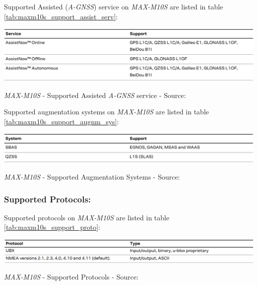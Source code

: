 \documentclass[report.tex]{subfiles}
\begin{document}
Supported Assisted (\textit{A-GNSS}) service on \textit{MAX-M10S} are listed in table \ref{tab:maxm10s_support_assist_serv}:

\begin{table}[H]
	\centering
	\includegraphics[width=1\textwidth]{Include/Figure/comp/maxm10s_support_assist_serv.png}
\caption{\textit{MAX-M10S} - Supported Assisted \textit{A-GNSS} service - Source: \cite{MAXM10S}}
\label{tab:maxm10s_support_assist_serv}
\end{table}

Supported augmentation systems on \textit{MAX-M10S} are listed in table \ref{tab:maxm10s_support_augnm_sys}:

\begin{table}[H]
	\centering
	\includegraphics[width=1\textwidth]{Include/Figure/comp/maxm10s_support_augnm_sys.png}
\caption{\textit{MAX-M10S} - Supported Augmentation Systems - Source: \cite{MAXM10S}}
\label{tab:maxm10s_support_augnm_sys}
\end{table}

\pagebreak
\subsubsection{Supported Protocols:}

Supported protocols on \textit{MAX-M10S} are listed in table \ref{tab:maxm10s_support_proto}:

\begin{table}[H]
	\centering
	\includegraphics[width=1\textwidth]{Include/Figure/comp/maxm10s_support_proto.png}
\caption{\textit{MAX-M10S} - Supported Protocols - Source: \cite{MAXM10S}}
\label{tab:maxm10s_support_proto}
\end{table}
\end{document}
